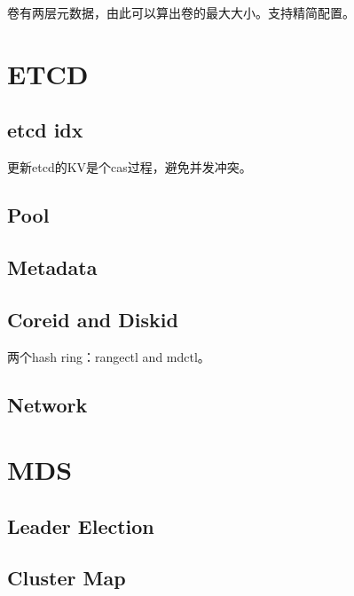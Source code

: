 卷有两层元数据，由此可以算出卷的最大大小。支持精简配置。

\section{ETCD}

\subsection{etcd idx}

更新etcd的KV是个cas过程，避免并发冲突。

\subsection{Pool}


\subsection{Metadata}


\subsection{Coreid and Diskid}


两个hash ring：rangectl and mdctl。

\subsection{Network}


\section{MDS}

\subsection{Leader Election}

\subsection{Cluster Map}


